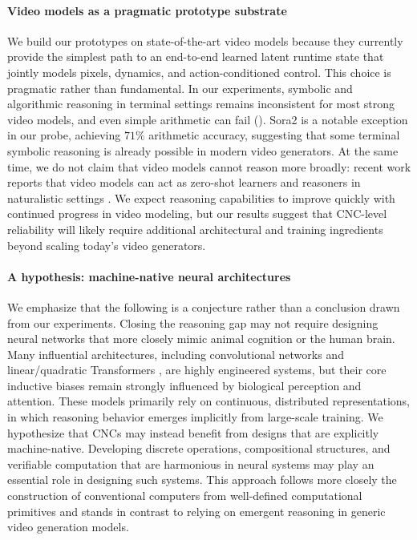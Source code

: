\paragraph{Video models as a pragmatic prototype substrate}
We build our prototypes on state-of-the-art video models because they currently provide the simplest path to an end-to-end learned latent runtime state that jointly models pixels, dynamics, and action-conditioned control. This choice is pragmatic rather than fundamental. In our experiments, symbolic and algorithmic reasoning in terminal settings remains inconsistent for most strong video models, and even simple arithmetic can fail (). Sora2 is a notable exception in our probe, achieving $71\%$ arithmetic accuracy, suggesting that some terminal symbolic reasoning is already possible in modern video generators. At the same time, we do not claim that video models cannot reason more broadly: recent work reports that video models can act as zero-shot learners and reasoners in naturalistic settings \citep{wiedemer2025video}. We expect reasoning capabilities to improve quickly with continued progress in video modeling, but our results suggest that CNC-level reliability will likely require additional architectural and training ingredients beyond scaling today's video generators.

\paragraph{A hypothesis: machine-native neural architectures}
We emphasize that the following is a conjecture rather than a conclusion drawn from our experiments. Closing the reasoning gap may not require designing neural networks that more closely mimic animal cognition or the human brain.
Many influential architectures, including convolutional networks \citep{fukushima1980neocognitron} and linear/quadratic Transformers \citep{schmidhuber92fastweights,vaswani2017attention}, are highly engineered systems, but their core inductive biases remain strongly influenced by biological perception and attention. These models primarily rely on continuous, distributed representations, in which reasoning behavior emerges implicitly from large-scale training.
We hypothesize that CNCs may instead benefit from designs that are explicitly machine-native. Developing discrete operations, compositional structures, and verifiable computation that are harmonious in neural systems may play an essential role in designing such systems. This approach follows more closely the construction of conventional computers from well-defined computational primitives and stands in contrast to relying on emergent reasoning in generic video generation models.

